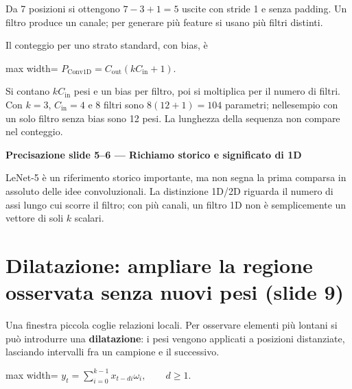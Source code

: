\documentclass[11pt,a4paper,oneside,openany]{book}
\renewenvironment{quote}{\list{}{\leftmargin=1em\rightmargin=0pt}\item\relax}{\endlist}
\begin{document}
Da 7 posizioni si ottengono \(7-3+1=5\) uscite con stride 1 e senza padding. Un filtro produce un canale; per generare più feature si usano più filtri distinti.

Il conteggio per uno strato standard, con bias, è

\begin{center}
\begin{adjustbox}{max width=\linewidth}
$\displaystyle \boxed{P_{\mathrm{Conv1D}}=C_{\mathrm{out}}(kC_{\mathrm{in}}+1).}$
\end{adjustbox}
\end{center}

Si contano \(kC_{\mathrm{in}}\) pesi e un bias per filtro, poi si moltiplica per il numero di filtri. Con \(k=3\), \(C_{\mathrm{in}}=4\) e 8 filtri sono \(8(12+1)=104\) parametri; nell\textquotesingle esempio con un solo filtro senza bias sono 12 pesi. La lunghezza della sequenza non compare nel conteggio.

\begin{quote}
\textbf{Precisazione slide 5--6 --- Richiamo storico e significato di 1D}
\end{quote}

\begin{quote}
LeNet-5 è un riferimento storico importante, ma non segna la prima comparsa in assoluto delle idee convoluzionali. La distinzione 1D/2D riguarda il numero di assi lungo cui scorre il filtro; con più canali, un filtro 1D non è semplicemente un vettore di soli \(k\) scalari.
\end{quote}

\section{Dilatazione: ampliare la regione osservata senza nuovi pesi (slide 9)}\label{f04-r135}

Una finestra piccola coglie relazioni locali. Per osservare elementi più lontani si può introdurre una \textbf{dilatazione}: i pesi vengono applicati a posizioni distanziate, lasciando intervalli fra un campione e il successivo.

\begin{center}
\begin{adjustbox}{max width=\linewidth}
$\displaystyle \boxed{y_t=\sum_{i=0}^{k-1}x_{t-di}\omega_i,\qquad d\geq1.}$
\end{adjustbox}
\end{center}
\end{document}
